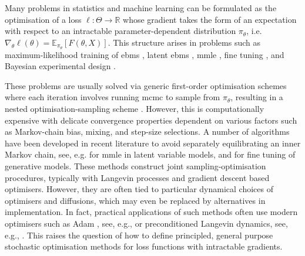 Many problems in statistics and machine learning can be formulated as the optimisation of a loss $\ell:\Theta\rightarrow\mathbb{R}$ whose gradient takes the form of an expectation with respect to an intractable parameter-dependent distribution $\pi_\theta$, i.e.\ $\nabla_\theta \ell(\theta) = \mathbb{E}_{\pi_\theta}[F(\theta, X)]$. This structure arises in problems such as maximum-likelihood training of \glspl*{ebm} \citep{cd_original,nijkamp2019learning,song2021train,oliva2025uniformintimeconvergenceboundspersistent}, latent \glspl*{ebm} \citep{pang2020learning,marks2025learninglatentenergybasedmodels}, \gls*{mmle} \citep{atchade2017perturbed,de_bortoli_efficient_2021,pmlr-v206-kuntz23a,lim2024momentumparticlemaximumlikelihood,akyildiz2025interacting}, fine tuning \citep{marion2025implicitdiffusionefficientoptimization}, and Bayesian experimental design \citep{iollo2025bayesian}.

These problems are usually solved via generic first-order optimisation schemes where each iteration involves running \gls*{mcmc} to sample from $\pi_\theta$, resulting in a nested optimisation-sampling scheme \citep{younes1999convergence,andrieu2014markovian,atchade2017perturbed,de_bortoli_efficient_2021}. However, this is computationally expensive with delicate convergence properties dependent on various factors such as Markov-chain bias, mixing, and step-size selections. A number of algorithms have been developed in recent literature to avoid separately equilibrating an inner Markov chain, see, e.g. \citet{pmlr-v206-kuntz23a,lim2024momentumparticlemaximumlikelihood,akyildiz2025interacting} for \gls*{mmle} in latent variable models, and \citet{marion2025implicitdiffusionefficientoptimization} for fine tuning of generative models. These methods construct joint sampling-optimisation procedures, typically with Langevin processes and gradient descent based optimisers. However, they are often tied to particular dynamical choices of optimisers and diffusions, which may even be replaced by alternatives in implementation. In fact, practical applications of such methods often use modern optimisers such as Adam \citep{kingma2017adammethodstochasticoptimization}, see, e.g., \citet{pmlr-v206-kuntz23a,marks2025learninglatentenergybasedmodels} or preconditioned Langevin dynamics, see, e.g., \citet{glyn2025statistical,wang2026training,marks2025learninglatentenergybasedmodels}. This raises the question of how to define principled, general purpose stochastic optimisation methods for loss functions with intractable gradients.

